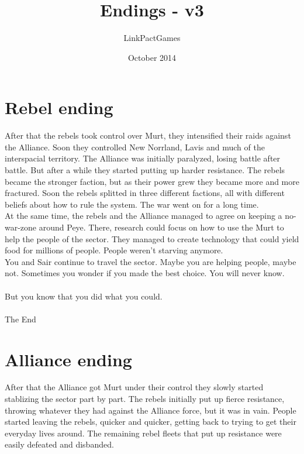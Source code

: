 \documentclass[a4paper,12pt]{article}
\begin{document}
\title{Endings - v3}
\author{LinkPactGames}
\date{October 2014}
\maketitle

\section{Rebel ending}

After that the rebels took control over Murt, they intensified their raids against the Alliance.
Soon they controlled New Norrland, Lavis and much of the interspacial territory.
The Alliance was initially paralyzed, losing battle after battle. But after a while they started
putting up harder resistance.
The rebels became the stronger faction, but as their power grew they became more and more fractured.
Soon the rebels splitted in three different factions, all with different beliefs about how to rule the system.
The war went on for a long time.\\

At the same time, the rebels and the Alliance managed to agree on keeping a no-war-zone around Peye.
There, research could focus on how to use the Murt to help the people of the sector. They managed to create technology that
could yield food for millions of people. People weren't starving anymore.\\

You and Sair continue to travel the sector. Maybe you are helping people, maybe not.
Sometimes you wonder if you made the best choice. You will never know.\\\\
But you know that you did what you could.\\\\
The End

\section{Alliance ending}

After that the Alliance got Murt under their control they slowly started stablizing the sector part by part.
The rebels initially put up fierce resistance, throwing whatever they had against the Alliance force, but it was in vain. 
People started leaving the rebels, quicker and quicker, getting back to trying to get their everyday lives around.
The remaining rebel fleets that put up resistance were easily defeated and disbanded.\\
\end{document}
